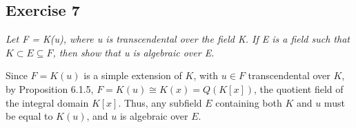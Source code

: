 \subsection*{Exercise 7}
\textit{Let F = K(u), where u is transcendental over the field K. If E is a field such that $K \subset E \subseteq F$, then show that u is algebraic over E.}

\vspace{5 mm}
Since $F = K(u)$ is a simple extension of $K$, with $u \in F$ transcendental over $K$, by Proposition 6.1.5, $F = K(u) \cong K(x) = Q(K[x])$, the quotient field of the integral domain $K[x]$. Thus, any subfield $E$ containing both $K$ and $u$ must be equal to $K(u)$, and $u$ is algebraic over $E$.